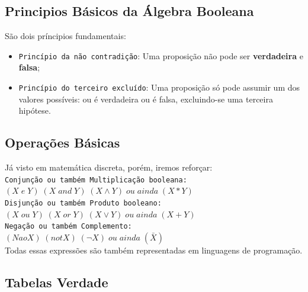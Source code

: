 \documentclass[12pt, onecolumn]{article}
\begin{document}
	\subsection{\centering Principios Básicos da Álgebra Booleana}
	
	São dois príncipios fundamentais:\\

	\begin{itemize}
		\item \texttt{Princípio da não contradição}: Uma proposição não pode 
			ser \textbf{verdadeira} e \textbf{falsa};\\
		\item \texttt{Princípio do terceiro excluído}: Uma proposição só 
			pode assumir um dos valores possíveis: ou é verdadeira 
			ou é falsa, excluindo-se uma terceira hipótese.\\
	\end{itemize}

	\subsection{\centering Operações Básicas}

	Já visto em matemática discreta, porém, iremos reforçar:\\
	\newline
	\texttt{Conjunção ou também Multiplicação booleana:}\\
	$(X\;e\;Y) \; (X\;and\;Y)\;(X \land Y)\;ou\;ainda\;(X * Y)$\\
	\newline
	\texttt{Disjunção ou também Produto booleano:}\\
	$(X\;ou\;Y) \; (X\;or\;Y) \; (X \lor Y)\;ou\;ainda\;(X + Y)$\\
	\newline
	\texttt{Negação ou também Complemento:}\\
	$(Nao X) \; (not X) \; (\lnot X)\;ou\;ainda\;(\bar{X})$\\
	\newline
	Todas essas expressões são também representadas em linguagens de 
	programação.\\
		
	\subsection{\centering Tabelas Verdade}
	
\end{document}
